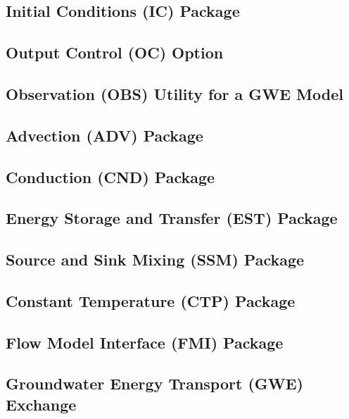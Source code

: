 \newpage
\subsection{Initial Conditions (IC) Package}


\newpage
\subsection{Output Control (OC) Option}


\newpage
\subsection{Observation (OBS) Utility for a GWE Model}


\newpage
\subsection{Advection (ADV) Package}


\newpage
\subsection{Conduction (CND) Package}


\newpage
\subsection{Energy Storage and Transfer (EST) Package}


\newpage
\subsection{Source and Sink Mixing (SSM) Package}


\newpage
\subsection{Constant Temperature (CTP) Package}


\newpage
\subsection{Flow Model Interface (FMI) Package}


\newpage
\subsection{Groundwater Energy Transport (GWE) Exchange}



